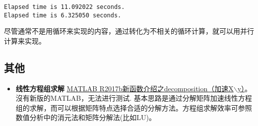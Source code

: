 \vspace{-0.8cm}
\begin{lstlisting}
Elapsed time is 11.092022 seconds.
Elapsed time is 6.325050 seconds.
\end{lstlisting}

尽管通常不是用循环来实现的内容，通过转化为不相关的循环计算，就可以用并行计算来实现。















\subsection{其他}

\begin{itemize}
    \item \textbf{线性方程组求解} \href{https://zhuanlan.zhihu.com/p/30958676}{MATLAB R2017b新函数介绍之decomposition（加速X$\backslash$y）}。沒有新版的MATLAB，无法进行测试. 基本思路是通过分解矩阵加速线性方程组的求解，而可以根据矩阵特点选择合适的分解方法。方程组求解效率可参照数值分析中的消元法和矩阵分解法(比如LU)。
\end{itemize}